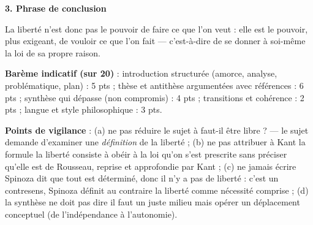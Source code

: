 \documentclass[11pt]{article}
\begin{document}
\begin{corrige}
\textbf{3. Phrase de conclusion}

\guillemotleft La liberté n'est donc pas le pouvoir de faire ce que l'on veut : elle est le pouvoir, plus exigeant, de vouloir ce que l'on fait --- c'est-à-dire de se donner à soi-même la loi de sa propre raison. \guillemotright

\textbf{Barème indicatif (sur 20)} : introduction structurée (amorce, analyse, problématique, plan) : 5 pts ; thèse et antithèse argumentées avec références : 6 pts ; synthèse qui dépasse (non compromis) : 4 pts ; transitions et cohérence : 2 pts ; langue et style philosophique : 3 pts.

\textbf{Points de vigilance} : (a) ne pas réduire le sujet à \guillemotleft faut-il être libre ? \guillemotright --- le sujet demande d'examiner une \emph{définition} de la liberté ; (b) ne pas attribuer à Kant la formule \guillemotleft la liberté consiste à obéir à la loi qu'on s'est prescrite \guillemotright sans préciser qu'elle est de Rousseau, reprise et approfondie par Kant ; (c) ne jamais écrire \guillemotleft Spinoza dit que tout est déterminé, donc il n'y a pas de liberté \guillemotright : c'est un contresens, Spinoza définit au contraire la liberté comme nécessité comprise ; (d) la synthèse ne doit pas dire \guillemotleft il faut un juste milieu \guillemotright mais opérer un déplacement conceptuel (de l'indépendance à l'autonomie).
\end{corrige}
\end{document}
